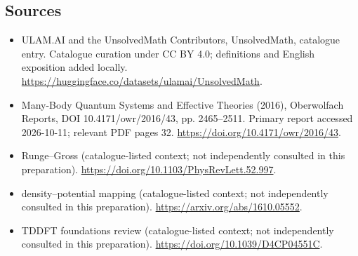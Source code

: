 \documentclass[11pt]{article}
\begin{document}
\subsection{Sources}
\begin{itemize}
\item[\hypertarget{source:statement:1}{S1}] ULAM.AI and the UnsolvedMath Contributors, UnsolvedMath, catalogue entry. Catalogue curation under CC BY 4.0; definitions and English exposition added locally.
\url{https://huggingface.co/datasets/ulamai/UnsolvedMath}.
\item[\hypertarget{source:statement:2}{S2}] Many-Body Quantum Systems and Effective Theories (2016), Oberwolfach Reports, DOI 10.4171/owr/2016/43, pp. 2465--2511. Primary report accessed 2026-10-11; relevant PDF pages 32.
\url{https://doi.org/10.4171/owr/2016/43}.
\item[\hypertarget{source:statement:3}{S3}] Runge--Gross (catalogue-listed context; not independently consulted in this preparation).
\url{https://doi.org/10.1103/PhysRevLett.52.997}.
\item[\hypertarget{source:statement:4}{S4}] density--potential mapping (catalogue-listed context; not independently consulted in this preparation).
\url{https://arxiv.org/abs/1610.05552}.
\item[\hypertarget{source:statement:5}{S5}] TDDFT foundations review (catalogue-listed context; not independently consulted in this preparation).
\url{https://doi.org/10.1039/D4CP04551C}.
\end{itemize}
\label{end:statement}
\end{document}
